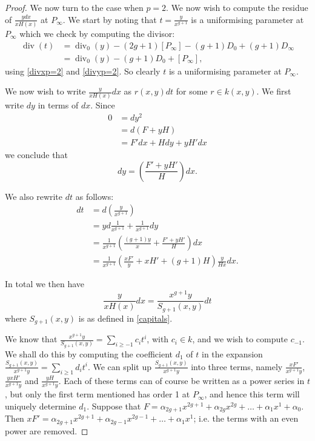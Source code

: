 \documentclass[draft, 11pt]{article} %
\theoremstyle{plain}
\theoremstyle{remark}
\DeclareMathOperator{\di}{div}
\begin{document}
\begin{proof}
We now turn to the case when $p=2$.
We now wish to compute the residue of $\frac{ydx}{xH(x)}$ at $P_\infty$.
We start by noting that $t = \frac{y}{x^{g+1}}$ is a uniformising parameter at $P_\infty$ which we check by computing the divisor:
\begin{align*}
\di(t) & = \di_0(y) - (2g+1)[P_\infty] -(g+1)D_0 + (g+1)D_\infty \\
& = \di_0(y)-(g+1)D_0 + [P_\infty],
\end{align*}
using \eqref{divxp=2} and \eqref{divyp=2}.
So clearly $t$ is a uniformising parameter at $P_\infty$.

We now wish to write $\frac{y}{xH(x)}dx$ as $r(x,y)dt$ for some $r \in k(x,y)$.
We first write $dy$ in terms of $dx$.
Since
\begin{align*}
0 & =  dy^2 \\
& =  d(F+yH) \\
& =  F'dx + Hdy + yH'dx
\end{align*}
we conclude that
\[
dy = \left( \frac{F'+yH'}{H} \right) dx.
\]

We also rewrite $dt$ as follows:
\begin{align*}
dt & =  d\left( \frac{y}{x^{g+1}} \right) \\
& =  yd\frac{1}{x^{g+1}} + \frac{1}{x^{g+1}}dy \\
& =  \frac{1}{x^{g+1}} \left( \frac{(g+1)y}{x} + \frac{F'+yH'}{H} \right) dx \\
& =  \frac{1}{x^{g+1}} \left( \frac{xF'}{y} + xH' + (g+1)H \right) \frac{y}{Hx} dx.
\end{align*}

In total we then have
\[
\frac{y}{xH(x)}dx = \frac{x^{g+1}y}{S_{g+1}(x,y)}dt
\]
where $S_{g+1}(x,y)$ is as defined in \eqref{capitals}.

We know that $\frac{x^{g+1}y}{S_{g+1}(x,y)} = \sum_{i\geq -1} c_i t^i$, with $c_i \in k$, and we wish to compute $c_{-1}$.
We shall do this by computing the coefficient $d_1$ of $t$ in the expansion $\frac{S_{g+1}(x,y)}{x^{g+1}y} = \sum_{i\geq 1}d_it^i$.
We can split up $\frac{S_{g+1}(x,y)}{x^{g+1}y}$ into three terms, namely $\frac{xF'}{x^{g+1}y}$, $\frac{yxH'}{x^{g+1}y}$ and $\frac{yH}{x^{g+1}y}$.
Each of these terms can of course be written as a power series in $t$, but only the first term mentioned has order 1 at $P_\infty$, and hence this term will uniquely determine $d_1$.
Suppose that $F = \alpha_{2g+1}x^{2g+1} + \alpha_{2g}x^{2g} + \ldots + \alpha_1x^1 + \alpha_0$.
Then $xF'= \alpha_{2g+1}x^{2g+1} + \alpha_{2g-1}x^{2g-1} + \ldots + \alpha_1x^1$; i.e. the terms with an even power are removed.


\end{proof}
\end{document}
